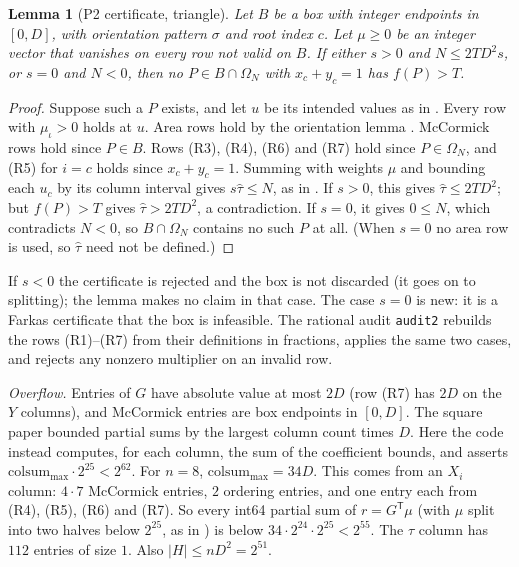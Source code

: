 \documentclass[11pt]{amsart}
\newtheorem{lemma}[theorem]{Lemma}
\theoremstyle{definition}
\newcommand{\Om}{\Omega}
\begin{document}
\begin{lemma}[P2 certificate, triangle]\label{lem:p2}
Let $B$ be a box with integer endpoints in $[0,D]$, with orientation pattern $\sigma$ and root index $c$. Let $\mu \ge 0$ be an integer vector that vanishes on every row not valid on $B$. If either $s > 0$ and $N \le 2TD^2 s$, or $s = 0$ and $N < 0$, then no $P \in B \cap \Om_N$ with $x_c + y_c = 1$ has $f(P) > T$.
\end{lemma}
\begin{proof}
Suppose such a $P$ exists, and let $u$ be its intended values as in \cite[App.~A.2]{N9}. Every row with $\mu_\iota > 0$ holds at $u$. Area rows hold by the orientation lemma \cite[Lemma~A.1]{N9}. McCormick rows hold since $P \in B$. Rows (R3), (R4), (R6) and (R7) hold since $P \in \Om_N$, and (R5) for $i = c$ holds since $x_c + y_c = 1$. Summing with weights $\mu$ and bounding each $u_c$ by its column interval gives $s\hat\tau \le N$, as in \cite[Lemma~A.2]{N9}. If $s > 0$, this gives $\hat\tau \le 2TD^2$; but $f(P) > T$ gives $\hat\tau > 2TD^2$, a contradiction. If $s = 0$, it gives $0 \le N$, which contradicts $N < 0$, so $B \cap \Om_N$ contains no such $P$ at all. (When $s = 0$ no area row is used, so $\hat\tau$ need not be defined.)
\end{proof}
If $s < 0$ the certificate is rejected and the box is not discarded (it goes on to splitting); the lemma makes no claim in that case. The case $s = 0$ is new: it is a Farkas certificate that the box is infeasible. The rational audit \texttt{audit2} rebuilds the rows (R1)--(R7) from their definitions in fractions, applies the same two cases, and rejects any nonzero multiplier on an invalid row. %

\emph{Overflow.} Entries of $G$ have absolute value at most $2D$ (row (R7) has $2D$ on the $Y$ columns), and McCormick entries are box endpoints in $[0,D]$. The square paper bounded partial sums by the largest column count times $D$. Here the code instead computes, for each column, the sum of the coefficient bounds, and asserts $\mathrm{colsum}_{\max}\cdot2^{25} < 2^{62}$. For $n = 8$, $\mathrm{colsum}_{\max} = 34D$. This comes from an $X_i$ column: $4\cdot7$ McCormick entries, $2$ ordering entries, and one entry each from (R4), (R5), (R6) and (R7). So every int64 partial sum of $r = G^{\mathsf T}\mu$ (with $\mu$ split into two halves below $2^{25}$, as in \cite[App.~A.5]{N9}) is below $34\cdot2^{24}\cdot2^{25} < 2^{55}$. The $\tau$ column has $112$ entries of size $1$. Also $\lvert H\rvert \le nD^2 = 2^{51}$. %
\end{document}
